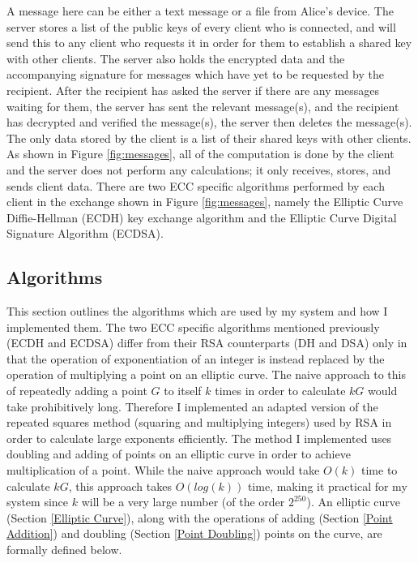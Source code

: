 \documentclass[12pt,a4paper]{article}
\begin{document}
A message here can be either a text message or a file from Alice's device. 
The server stores a list of the public keys of every client who is connected, 
and will send this to any client who requests it in order for them to establish a shared key with other clients. 
The server also holds the encrypted data and the accompanying signature for messages which have yet to be requested by the recipient. 
After the recipient has asked the server if there are any messages waiting for them, the server has sent the relevant message(s), 
and the recipient has decrypted and verified the message(s), the server then deletes the message(s). 
The only data stored by the client is a list of their shared keys with other clients. 
As shown in Figure \ref{fig:messages}, all of the computation is done by the client and the server does not perform any calculations; 
it only receives, stores, and sends client data. 
There are two ECC specific algorithms performed by each client in the exchange shown in Figure \ref{fig:messages}, 
namely the Elliptic Curve Diffie-Hellman (ECDH) key exchange algorithm and the Elliptic Curve Digital Signature Algorithm (ECDSA). 

\subsection{Algorithms} \noindent \label{Algorithms}
This section outlines the algorithms which are used by my system and how I implemented them. 
The two ECC specific algorithms mentioned previously (ECDH and ECDSA) differ from their RSA counterparts (DH and DSA) only in that 
the operation of exponentiation of an integer is instead replaced by the operation of multiplying a point on an elliptic curve. 
The naive approach to this of repeatedly adding a point $G$ to itself $k$ times in order to calculate $kG$ would take prohibitively long. 
Therefore I implemented an adapted version of the repeated squares method (squaring and multiplying integers) 
used by RSA in order to calculate large exponents efficiently. 
The method I implemented uses doubling and adding of points on an elliptic curve in order to achieve multiplication of a point. 
While the naive approach would take $O(k)$ time to calculate $kG$, this approach takes $O(log(k))$ time, 
making it practical for my system since $k$ will be a very large number (of the order $2^{250}$). 
An elliptic curve (Section \ref{Elliptic Curve}), along with the operations of adding (Section \ref{Point Addition}) 
and doubling (Section \ref{Point Doubling}) points on the curve, are formally defined below. 
\end{document}
